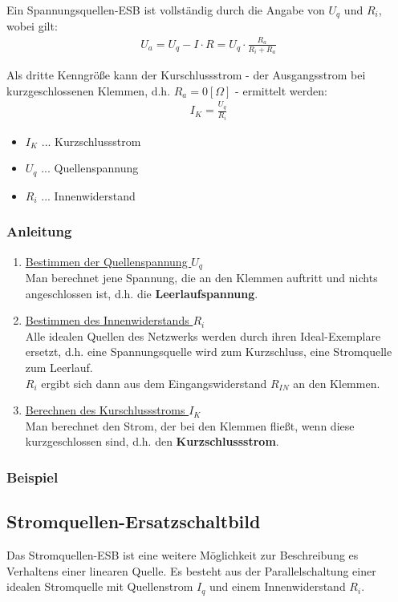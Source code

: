 Ein Spannungsquellen-ESB ist vollständig durch die Angabe von $U_q$ und $R_i$, wobei gilt:
\begin{align}
    U_a=U_q - I\cdot R = U_q \cdot \frac{R_a}{R_i+R_a}
\end{align}

Als dritte Kenngröße kann der Kurschlussstrom - der Ausgangsstrom bei kurzgeschlossenen Klemmen, d.h. $R_a = 0[\Omega]$ - ermittelt werden:
\begin{align}
    I_K = \frac{U_q}{R_i}
\end{align}
\begin{itemize}
    \item $I_K$ ... Kurzschlussstrom
    \item $U_q$ ... Quellenspannung
    \item $R_i$ ... Innenwiderstand
\end{itemize}

\subsubsection*{Anleitung}
\begin{enumerate}
    \item \underline{Bestimmen der Quellenspannung $U_q$} \\
    Man berechnet jene Spannung, die an den Klemmen auftritt und nichts angeschlossen ist, d.h. die \textbf{Leerlaufspannung}.
    
    \item \underline{Bestimmen des Innenwiderstands $R_i$} \\
    Alle idealen Quellen des Netzwerks werden durch ihren Ideal-Exemplare ersetzt, d.h. eine Spannungsquelle wird zum Kurzschluss, eine Stromquelle zum Leerlauf. \\
    $R_i$ ergibt sich dann aus dem Eingangswiderstand $R_{IN}$ an den Klemmen.
    
    \item \underline{Berechnen des Kurschlussstroms $I_K$} \\
    Man berechnet den Strom, der bei den Klemmen fließt, wenn diese kurzgeschlossen sind, d.h. den \textbf{Kurzschlussstrom}.
\end{enumerate}

\subsubsection*{Beispiel}

\subsection{Stromquellen-Ersatzschaltbild}
Das Stromquellen-ESB ist eine weitere Möglichkeit zur Beschreibung es Verhaltens einer linearen Quelle. Es besteht aus der Parallelschaltung einer idealen Stromquelle mit Quellenstrom $I_q$ und einem Innenwiderstand $R_i$. \\

